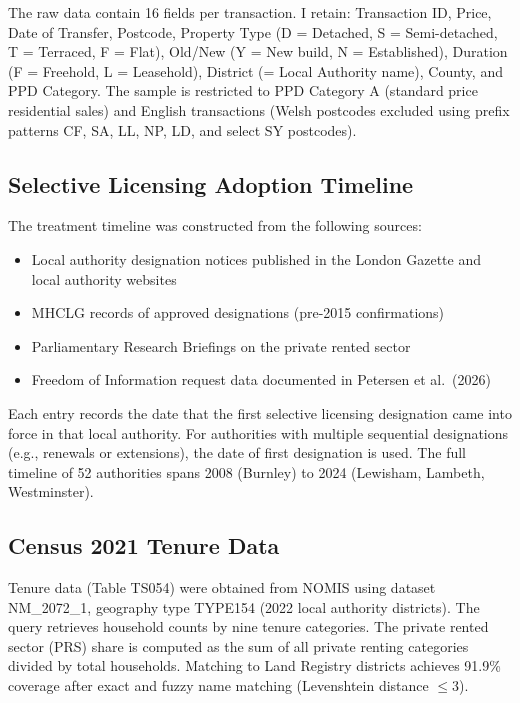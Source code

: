 \documentclass[12pt]{article}
\begin{document}
The raw data contain 16 fields per transaction. I retain: Transaction ID, Price, Date of Transfer, Postcode, Property Type (D = Detached, S = Semi-detached, T = Terraced, F = Flat), Old/New (Y = New build, N = Established), Duration (F = Freehold, L = Leasehold), District (= Local Authority name), County, and PPD Category. The sample is restricted to PPD Category A (standard price residential sales) and English transactions (Welsh postcodes excluded using prefix patterns CF, SA, LL, NP, LD, and select SY postcodes).

\subsection{Selective Licensing Adoption Timeline}

The treatment timeline was constructed from the following sources:
\begin{itemize}
    \item Local authority designation notices published in the London Gazette and local authority websites
    \item MHCLG records of approved designations (pre-2015 confirmations)
    \item Parliamentary Research Briefings on the private rented sector
    \item Freedom of Information request data documented in Petersen et al.\ (2026)
\end{itemize}

Each entry records the date that the first selective licensing designation came into force in that local authority. For authorities with multiple sequential designations (e.g., renewals or extensions), the date of first designation is used. The full timeline of 52 authorities spans 2008 (Burnley) to 2024 (Lewisham, Lambeth, Westminster).

\subsection{Census 2021 Tenure Data}

Tenure data (Table TS054) were obtained from NOMIS using dataset NM\_2072\_1, geography type TYPE154 (2022 local authority districts). The query retrieves household counts by nine tenure categories. The private rented sector (PRS) share is computed as the sum of all private renting categories divided by total households. Matching to Land Registry districts achieves 91.9\% coverage after exact and fuzzy name matching (Levenshtein distance $\leq 3$).
\end{document}
